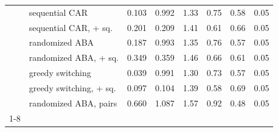 \begin{table}[t]
\begin{tabular}{llrrrrrr}
 & sequential CAR & 0.103 & 0.992 & 1.33 & 0.75 & 0.58 & 0.05 \\
 & sequential CAR, + sq. & 0.201 & 0.209 & 1.41 & 0.61 & 0.66 & 0.05 \\
 & randomized ABA & 0.187 & 0.993 & 1.35 & 0.76 & 0.57 & 0.05 \\
 & randomized ABA, + sq. & 0.349 & 0.359 & 1.46 & 0.66 & 0.61 & 0.05 \\
 & greedy switching & 0.039 & 0.991 & 1.30 & 0.73 & 0.57 & 0.05 \\
 & greedy switching, + sq. & 0.097 & 0.104 & 1.39 & 0.58 & 0.69 & 0.05 \\
 & randomized ABA, pairs & 0.660 & 1.087 & 1.57 & 0.92 & 0.48 & 0.05 \\
\cline{1-8}
\bottomrule
\end{tabular}
\end{table}
